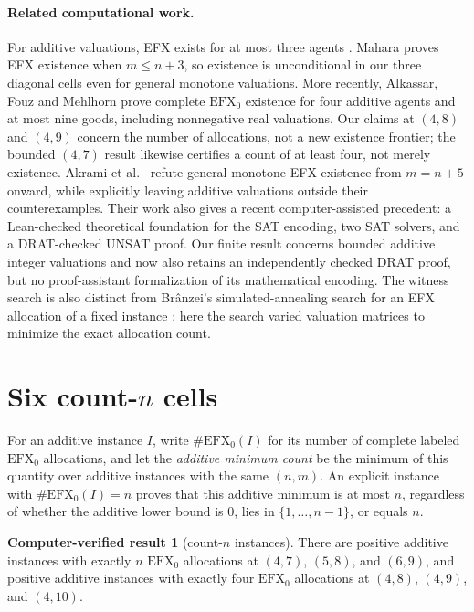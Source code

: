 \documentclass[11pt]{article}
\theoremstyle{plain}
\theoremstyle{definition}
\newtheorem{cverified}[theorem]{Computer-verified result}
\newcommand{\efxo}{\mathrm{EFX}_0}
\begin{document}
\paragraph{Related computational work.}
For additive valuations, EFX exists for at most three agents
\cite{ChaudhuryThree}.  Mahara \cite{Mahara2107} proves EFX existence when
$m\le n+3$, so existence is unconditional in our three diagonal cells even for
general monotone valuations.  More recently, Alkassar, Fouz and Mehlhorn
\cite{Alkassar2026} prove complete $\efxo$ existence for four additive agents
and at most nine goods, including nonnegative real valuations.  Our claims at
$(4,8)$ and $(4,9)$ concern the number of allocations, not a new existence
frontier; the bounded $(4,7)$ result likewise certifies a count of at least four,
not merely existence.
Akrami et al.\ \cite{Akrami2026SAT} refute general-monotone EFX existence from
$m=n+5$ onward, while explicitly leaving additive valuations outside their
counterexamples.  Their work also gives a recent computer-assisted precedent:
a Lean-checked theoretical foundation for the SAT encoding, two SAT solvers,
and a DRAT-checked UNSAT proof.  Our finite result concerns bounded additive
integer valuations and now also retains an independently checked DRAT proof,
but no proof-assistant formalization of its mathematical encoding.  The
witness search is also distinct
from Br\^anzei's simulated-annealing search for an EFX allocation of a fixed
instance \cite{Branzei2025}: here the search varied valuation matrices to minimize
the exact allocation count.

\section{Six count-\texorpdfstring{$n$}{n} cells}\label{sec:instances}

For an additive instance $I$, write $\#\efxo(I)$ for its number of complete
labeled $\efxo$ allocations, and let the \emph{additive minimum count} be the
minimum of this quantity over additive instances with the same $(n,m)$.  An
explicit instance with $\#\efxo(I)=n$ proves that this additive minimum is at
most $n$, regardless of whether the additive lower bound is $0$, lies in
$\{1,\ldots,n-1\}$, or equals $n$.

\begin{cverified}[count-$n$ instances]\label{cv:instances}
There are positive additive instances with exactly $n$ $\efxo$ allocations at
$(4,7)$, $(5,8)$, and $(6,9)$, and positive additive instances with exactly four
$\efxo$ allocations at $(4,8)$, $(4,9)$, and $(4,10)$.
\end{cverified}
\end{document}
